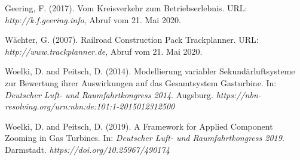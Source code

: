 \begin{thebibliography}{laengste Breite}

 Geering, F. (2017). Vom Kreisverkehr zum Betriebserlebnis. URL: \textit{http://k.f.geering.info}, Abruf vom 21. Mai 2020.

 W\"achter, G. (2007). Railroad Construction Pack Trackplanner. URL: \textit{http://www.trackplanner.de}, Abruf vom 21. Mai 2020.

 Woelki, D. and Peitsch, D. (2014). Modellierung variabler Sekund\"arluftsysteme zur Bewertung ihrer Auswirkungen auf das Gesamtsystem Gasturbine. In: \textit{Deutscher Luft- und Raumfahrtkongress 2014}. Augsburg. \textit{https://nbn-resolving.org/urn:nbn:de:101:1-2015012312500}

 Woelki, D. and Peitsch, D. (2019). A Framework for Applied Component Zooming in Gas Turbines. In: \textit{Deutscher Luft- und Raumfahrtkongress 2019}. Darmstadt. \textit{https://doi.org/10.25967/490174}

	
\end{thebibliography}
